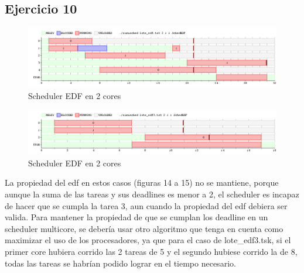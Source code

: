 \subsection{Ejercicio 10}
  \begin{figure}
  \includegraphics[scale=0.32]{images/lote.png}
  \caption{Scheduler EDF en 2 cores}
  \end{figure}
  \begin{figure}
  \includegraphics[scale=0.32]{images/lote3.png}
  \caption{Scheduler EDF en 2 cores}
  \end{figure}
La propiedad del edf en estos casos (figuras 14 a 15) no se mantiene, porque aunque la suma de las tareas y sus deadlines es menor a 2, el scheduler es incapaz de hacer que se cumpla la tarea 3, aun cuando la propiedad del edf debiera ser valida.
Para mantener la propiedad de que se cumplan los deadline en un scheduler multicore, se debería usar otro algoritmo que tenga en cuenta como maximizar el uso de los procesadores, ya que para el caso de lote\_edf3.tsk, si el primer core hubiera corrido las 2 tareas de 5 y el segundo hubiese corrido la de 8, todas las tareas se habrían podido lograr en el tiempo necesario.
